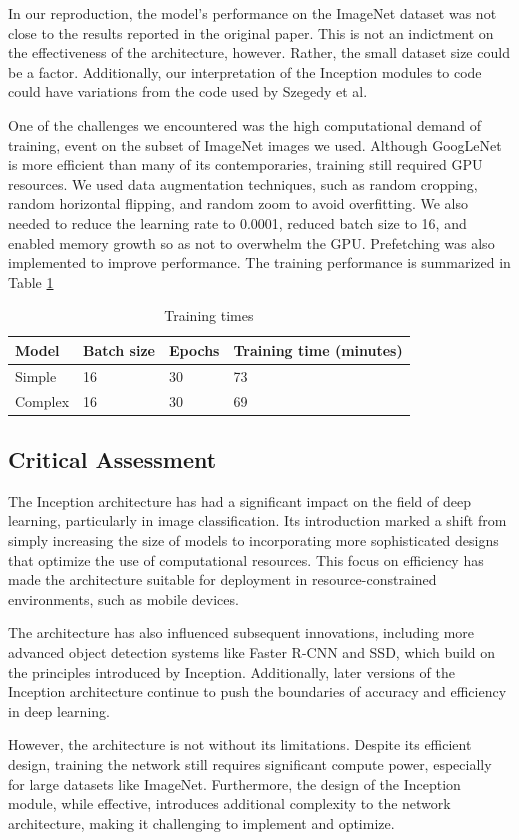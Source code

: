 \documentclass{article}
\begin{document}
In our reproduction, the model's performance on the ImageNet dataset was not  close to the results reported in the original paper. This is not an indictment on the effectiveness of the architecture, however. Rather, the small dataset size could be a factor. Additionally, our interpretation of the Inception modules to code could have variations from the code used by Szegedy et al.

One of the challenges we encountered was the high computational demand of training, event on the subset of ImageNet images we used. Although GoogLeNet is more efficient than many of its contemporaries, training still required GPU resources. We used data augmentation techniques, such as random cropping, random horizontal flipping, and random zoom to avoid overfitting. We also needed to reduce the learning rate to 0.0001, reduced batch size to 16, and enabled memory growth\cite{tensorflow_memory_growth} so as not to overwhelm the GPU. Prefetching was also implemented to improve performance\cite{tensorflow_data_performance}. The training performance is summarized in Table \ref{tab:training_times}

\begin{table}[ht]
    \centering
    \begin{tabular}{llll}
    \hline
    \textbf{Model} & \textbf{Batch size} & \textbf{Epochs} & \textbf{Training time (minutes)} \\  \hline
    Simple & 16 & 30 & 73 \\ \hline
    Complex & 16 & 30 & 69 \\ \hline
    \end{tabular}
    \caption{Training times}
    \label{tab:training_times}
\end{table}

\subsection{Critical Assessment}
The Inception architecture has had a significant impact on the field of deep learning, particularly in image classification. Its introduction marked a shift from simply increasing the size of models to incorporating more sophisticated designs that optimize the use of computational resources. This focus on efficiency has made the architecture suitable for deployment in resource-constrained environments, such as mobile devices.

The architecture has also influenced subsequent innovations, including more advanced object detection systems like Faster R-CNN and SSD, which build on the principles introduced by Inception. Additionally, later versions of the Inception architecture continue to push the boundaries of accuracy and efficiency in deep learning.

However, the architecture is not without its limitations. Despite its efficient design, training the network still requires significant compute power, especially for large datasets like ImageNet. Furthermore, the design of the Inception module, while effective, introduces additional complexity to the network architecture, making it  challenging to implement and optimize.



\end{document}
